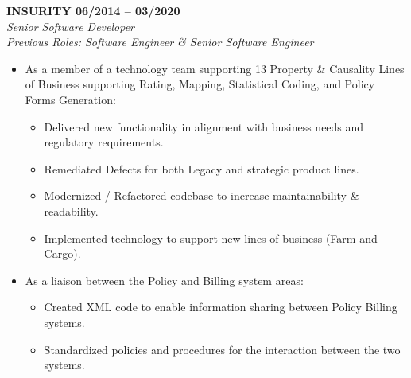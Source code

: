 


\begin{cvparagraph}

{\normalsize \textbf{ INSURITY \hfill 06/2014 -- 03/2020}} \\
{\sl Senior Software Developer} \\
{\sl Previous Roles: Software Engineer \& Senior Software Engineer} \\

\begin{itemize}
   \item As a member of a technology team supporting 13 Property \& Causality
      Lines of Business supporting Rating, Mapping, Statistical Coding, and Policy 
      Forms Generation:
   \begin{itemize}
      \item Delivered new functionality in alignment with business needs and 
         regulatory requirements.
      \item Remediated Defects for both Legacy and strategic product lines. 
      \item Modernized / Refactored codebase to increase maintainability \& 
         readability.
      \item Implemented technology to support new lines of business (Farm and Cargo).
   \end{itemize}

   \item As a liaison between the Policy and Billing system areas:
   \begin{itemize}
      \item Created XML code to enable information sharing between Policy Billing 
         systems.
      \item Standardized policies and procedures for the interaction between the 
         two systems.
   \end{itemize}


\end{itemize}
\end{cvparagraph}

